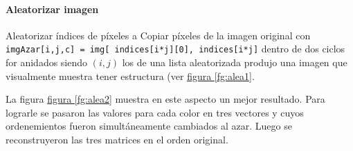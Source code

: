 \documentclass{article}
\begin{document}

\paragraph{Aleatorizar imagen} Aleatorizar índices de píxeles a 
Copiar píxeles de la imagen original con \verb'imgAzar[i,j,c] = img[ indices[i*j][0], indices[i*j]' dentro de dos ciclos for anidados siendo \((i,j)\) los  de una lista aleatorizada produjo una imagen que visualmente muestra tener estructura (ver \hyperref[fg:alea1]{figura \ref*{fg:alea1}}.

La figura \hyperref[fg:alea2]{figura \ref*{fg:alea2}} muestra en este aspecto un mejor resultado.
Para lograrle se pasaron las valores para cada color en tres vectores y cuyos ordenemientos fueron simultáneamente cambiados al azar.
Luego se reconstruyeron las tres matrices en el orden original.
\end{document}
